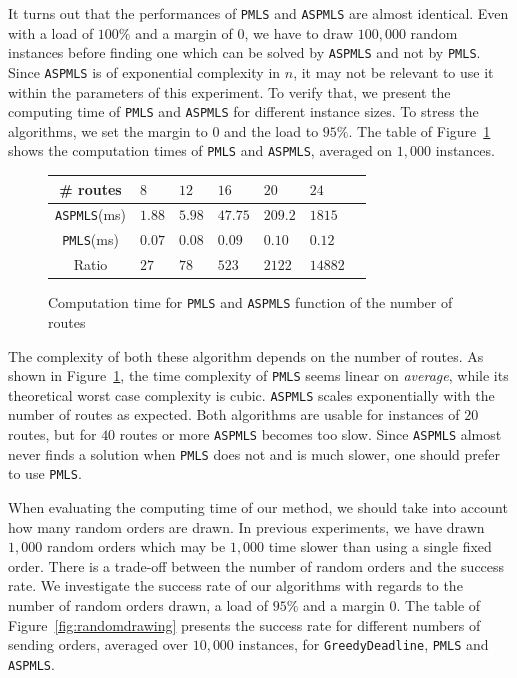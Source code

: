 \documentclass[a4paper,10pt]{article}
\newcommand\greedydeadline{\texttt{GreedyDeadline}\xspace}
\newcommand\PMLS{\texttt{PMLS}\xspace}
\newcommand\ASPMLS{\texttt{ASPMLS}\xspace}
\begin{document}
     It turns out that the performances of \PMLS and \ASPMLS are almost identical. Even with a load of $100\%$ and a margin of $0$, we have to draw $100,000$ random instances before finding one which can be solved by \ASPMLS and not by \PMLS. Since \ASPMLS is of exponential complexity in $n$, it may not be relevant to use it within the parameters of this experiment. To verify that, we present the computing time of \PMLS and \ASPMLS for different instance sizes. To stress the algorithms, we set the margin to $0$ and the load to $95\%$. The table of Figure~\ref{fig:tps_fpt} shows the computation times of \PMLS and \ASPMLS, averaged on $1,000$ instances. 

     
          \begin{figure}[h] 
       \begin{center}
   \begin{tabularx}{0.8\textwidth}{|c|X|X|X|X|X|X|}
    \hline
    \# routes& $8$ & $12$ & $16$& $20$ & $24$\\
    \hline
    \ASPMLS (ms) & $1.88$ &$5.98$&$47.75$&$209.2$&$1815$\\
    \hline
     \PMLS (ms) & $0.07$ &$0.08$&$0.09$&$0.10$&$0.12$\\
    \hline
    Ratio & $27$ &$78$&$523$&$2122$&$14882$\\
    \hline
      \end{tabularx}
      \end{center}
   \caption{Computation time for \PMLS and \ASPMLS function of the number of routes}
        \label{fig:tps_fpt}
     \end{figure}
    

  The complexity of both these algorithm depends on the number of routes. As shown in Figure~\ref{fig:tps_fpt}, the time complexity of \PMLS seems linear on \emph{average}, while its theoretical worst case complexity is cubic. \ASPMLS scales exponentially with the number of routes as expected. Both algorithms are usable for instances of $20$ routes, but for $40$ routes or more \ASPMLS becomes too slow. Since \ASPMLS almost never finds a solution when \PMLS does not and is much slower, one should prefer to use \PMLS. 

    When evaluating the computing time of our method, we should take into account how many random orders are drawn. In previous experiments, we have drawn $1,000$ random orders which may be $1,000$ time slower than using a single fixed order. There is a trade-off between the number of random orders and the success rate. We investigate the success rate of our algorithms with regards to the number of random orders drawn, a load of $95\%$ and a margin $0$. The table of Figure~\ref{fig:randomdrawing} presents the success rate for different numbers of sending orders, averaged over $10,000$ instances, for \greedydeadline, \PMLS and \ASPMLS.
\end{document}

